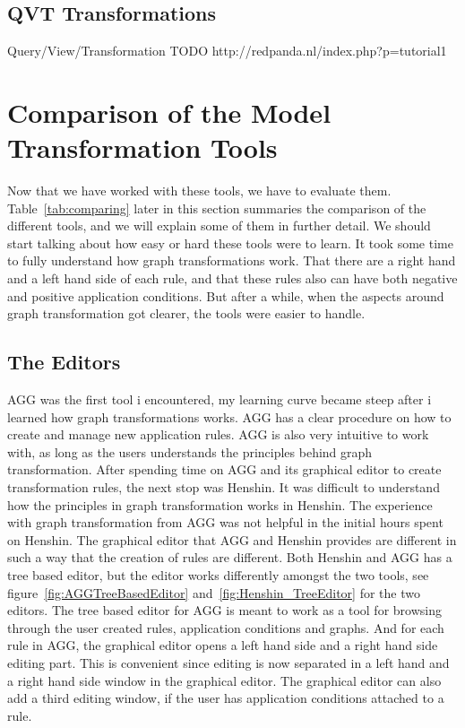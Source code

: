 \subsection{QVT Transformations}
Query/View/Transformation 
TODO
http://redpanda.nl/index.php?p=tutorial1

 
\section{Comparison of the Model Transformation Tools}
\label{comparison}

Now that we have worked with these tools, we have to evaluate them.
Table~\ref{tab:comparing} later in this section summaries the comparison of the
different tools, and we will explain some of them in further detail. We should
start talking about how easy or hard these tools were to learn. It took some
time to fully understand how graph transformations work. That there are a right
hand and a left hand side of each rule, and that these rules also can have both
negative and positive application conditions. But after a while, when the
aspects around graph transformation got clearer, the tools were easier to handle.

\subsection{The Editors}
AGG was the first tool i encountered, my learning curve became steep after i
learned how graph transformations works. AGG has a clear procedure on how to create and
manage new application rules. AGG is also very intuitive to work with, as long
as the users understands the principles behind graph transformation.
After spending time on AGG and its graphical editor to create transformation rules, the next
stop was Henshin. It was difficult to understand how the principles in graph
transformation works in Henshin. The experience with graph transformation from
AGG was not helpful in the initial hours spent on Henshin. The graphical editor
that AGG and Henshin provides are different in such a way that the creation of
rules are different. Both Henshin and AGG has a tree based editor, but the
editor works differently amongst the two tools, see
figure~\ref{fig:AGGTreeBasedEditor} and~\ref{fig:Henshin_TreeEditor} for the
two editors. The tree based editor for AGG is meant to work as a tool for
browsing through the user created rules, application conditions and graphs. And
for each rule in AGG, the graphical editor opens a left hand side and a right
hand side editing part. This is convenient since editing is now separated in a
left hand and a right hand side window in the graphical editor. The graphical editor can also
add a third editing window, if the user has application conditions attached to a
rule. 

